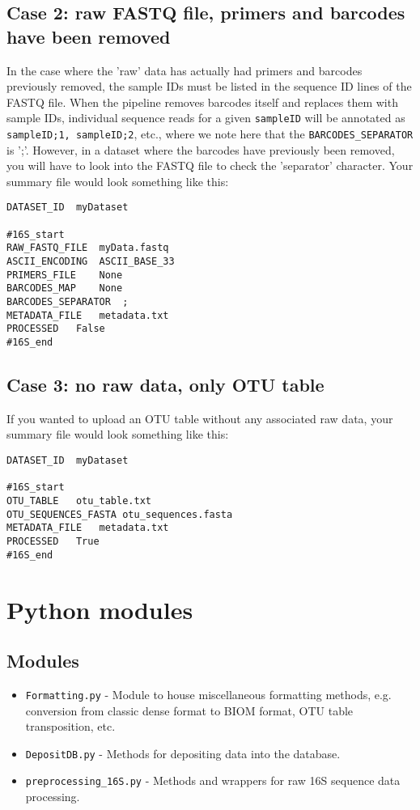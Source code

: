 \documentclass[11pt, oneside]{article}   	%
\begin{document}
\subsection{Case 2: raw FASTQ file, primers and barcodes have been removed}
In the case where the 'raw' data has actually had primers and barcodes previously removed, the sample IDs must be listed in the sequence ID lines of the FASTQ file.  When the pipeline removes barcodes itself and replaces them with sample IDs, individual sequence reads for a given {\tt sampleID} will be annotated as {\tt sampleID;1, sampleID;2}, etc., where we note here that the {\tt BARCODES\_SEPARATOR} is ';'.  However, in a dataset where the barcodes have previously been removed, you will have to look into the FASTQ file to check the 'separator' character.  Your summary file would look something like this:

\begin{verbatim}
DATASET_ID	myDataset

#16S_start
RAW_FASTQ_FILE	myData.fastq
ASCII_ENCODING	ASCII_BASE_33
PRIMERS_FILE	None
BARCODES_MAP	None
BARCODES_SEPARATOR	;
METADATA_FILE	metadata.txt
PROCESSED	False
#16S_end
\end{verbatim}
		
		
\subsection{Case 3: no raw data, only OTU table}		
If you wanted to upload an OTU table without any associated raw data, your summary file would look something like this:
\begin{verbatim}
DATASET_ID	myDataset

#16S_start
OTU_TABLE	otu_table.txt
OTU_SEQUENCES_FASTA	otu_sequences.fasta
METADATA_FILE	metadata.txt
PROCESSED	True
#16S_end
\end{verbatim}


\section{Python modules}
\subsection{Modules}
\begin{itemize}
  \item {\tt Formatting.py} - Module to house miscellaneous formatting methods, e.g. conversion from classic dense format to BIOM format, OTU table transposition, etc.
	\item {\tt DepositDB.py} - Methods for depositing data into the database.
	\item {\tt preprocessing\_16S.py} - Methods and wrappers for raw 16S sequence data processing.
\end{itemize}
\end{document}
